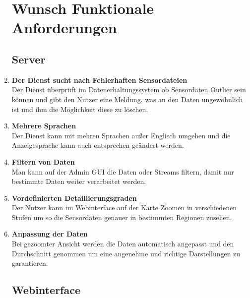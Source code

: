 \begin{enumerate}[label=\textbf{WF\arabic{enumi}0}]
	\setcounter{enumi}{99}
	\section{Wunsch Funktionale Anforderungen}
	
	\subsection{Server}
	
	\item \textbf{Der Dienst sucht nach Fehlerhaften Sensordateien}\\
	Der Dienst überprüft im Datenerhaltungssystem ob Sensordaten Outlier sein können und gibt den Nutzer eine Meldung, was an den Daten ungewöhnlich ist und ihm die Möglichkeit diese zu löschen.
	 
	\item \textbf{Mehrere Sprachen}\\
	Der Dienst kann mit mehren Sprachen außer Englisch umgehen und die Anzeigesprache kann auch entsprechen geändert werden. 
	
	\item \textbf{Filtern von Daten}\\
	Man kann auf der Admin GUI die Daten oder Streams filtern, damit nur bestimmte Daten weiter verarbeitet werden.
	
	\item \textbf{Vordefinierten Detaillierungsgraden}\\
	Der Nutzer kann im Webinterface auf der Karte Zoomen in verschiedenen Stufen um so die Sensordaten genauer in bestimmten Regionen zusehen.
	
	\item \textbf{Anpassung der Daten}\\
	Bei gezoomter Ansicht werden die Daten automatisch angepasst und den Durchschnitt genommen um eine angenehme und richtige Darstellungen zu garantieren.
	
		
	\subsection{Webinterface}
\end{enumerate}
	
	 
	  
